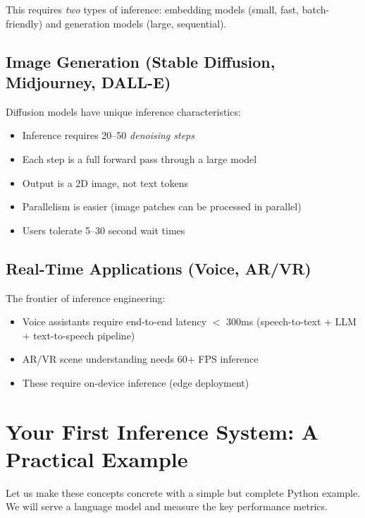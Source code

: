 \documentclass[12pt, twoside, openright]{book}
\begin{document}
This requires \textit{two} types of inference: embedding models
(small, fast, batch-friendly) and generation models (large, sequential).

\subsection{Image Generation (Stable Diffusion, Midjourney, DALL-E)}

Diffusion models have unique inference characteristics:
\begin{itemize}
  \item Inference requires 20--50 \textit{denoising steps}
  \item Each step is a full forward pass through a large model
  \item Output is a 2D image, not text tokens
  \item Parallelism is easier (image patches can be processed in parallel)
  \item Users tolerate 5--30 second wait times
\end{itemize}

\subsection{Real-Time Applications (Voice, AR/VR)}

The frontier of inference engineering:
\begin{itemize}
  \item Voice assistants require end-to-end latency $<$ 300ms
        (speech-to-text + LLM + text-to-speech pipeline)
  \item AR/VR scene understanding needs 60+ FPS inference
  \item These require on-device inference (edge deployment)
\end{itemize}

\section{Your First Inference System: A Practical Example}

Let us make these concepts concrete with a simple but complete
Python example.
We will serve a language model and measure the key performance metrics.
\end{document}
